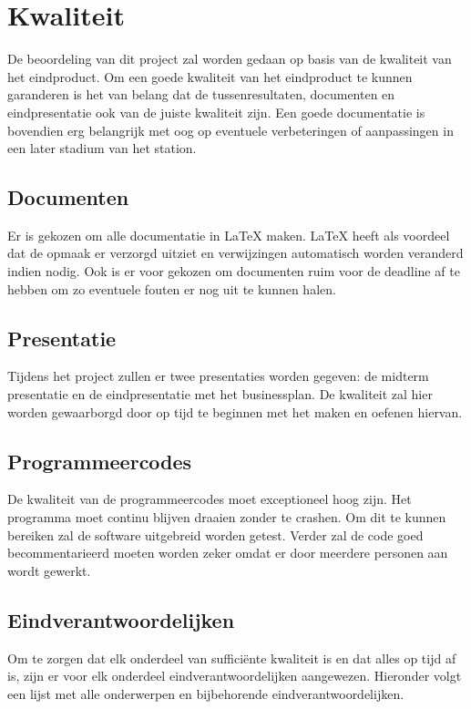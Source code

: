 \section{Kwaliteit}

De beoordeling van dit project zal worden gedaan op basis van de kwaliteit van het eindproduct. Om een goede kwaliteit van het eindproduct te kunnen garanderen is het van belang dat de tussenresultaten, documenten en eindpresentatie ook van de juiste kwaliteit zijn. Een goede documentatie is bovendien erg belangrijk met oog op eventuele verbeteringen of aanpassingen in een later stadium van het station.

\subsection{Documenten}

Er is gekozen om alle documentatie in \LaTeX\xspace maken. \LaTeX\xspace heeft als voordeel dat de opmaak er verzorgd uitziet en verwijzingen automatisch worden veranderd indien nodig. Ook is er voor gekozen om documenten ruim voor de deadline af te hebben om zo eventuele fouten er nog uit te kunnen halen.

\subsection{Presentatie}

Tijdens het project zullen er twee presentaties worden gegeven: de midterm presentatie en de eindpresentatie met het businessplan. De kwaliteit zal hier worden gewaarborgd door op tijd te beginnen met het maken en oefenen hiervan. 

\subsection{Programmeercodes}

De kwaliteit van de programmeercodes moet exceptioneel hoog zijn. Het programma moet continu blijven draaien zonder te crashen. Om dit te kunnen bereiken zal de software uitgebreid worden getest. Verder zal de code goed becommentarieerd moeten worden zeker omdat er door meerdere personen aan wordt gewerkt.

\subsection{Eindverantwoordelijken}

Om te zorgen dat elk onderdeel van suffici\"ente kwaliteit is en dat alles op tijd af is, zijn er voor elk onderdeel eindverantwoordelijken aangewezen. Hieronder volgt een lijst met alle onderwerpen en bijbehorende eindverantwoordelijken.


